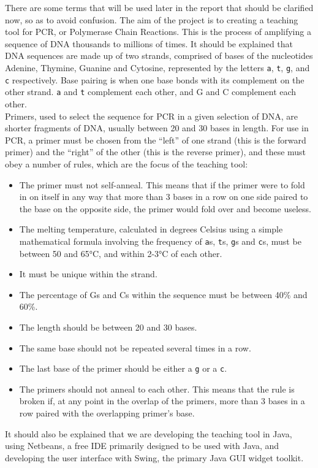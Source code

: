 There are some terms that will be used later in the report that should be clarified now, so as to avoid confusion. The aim of the project is to creating a teaching tool for PCR, or Polymerase Chain Reactions. This is the process of amplifying a sequence of DNA thousands to millions of times. It should be explained that DNA sequences are made up of two strands, comprised of bases of the nucleotides Adenine, Thymine, Guanine and Cytosine, represented by the letters \verb£a£, \verb£t£, \verb£g£, and \verb£c£ respectively. Base pairing is when one base bonds with its complement on the other strand. \verb£a£ and \verb£t£ complement each other, and G and C complement each other.\\
Primers, used to select the sequence for PCR in a given selection of DNA, are shorter fragments of DNA, usually between 20 and 30 bases in length. For use in PCR, a primer must be chosen from the “left” of one strand (this is the forward primer) and the “right” of the other (this is the reverse primer), and these must obey a number of rules, which are the focus of the teaching tool:
\begin{itemize}
\item The primer must not self-anneal. This means that if the primer were to fold in on itself in any way that more than 3 bases in a row on one side paired to the base on the opposite side, the primer would fold over and become useless.
\item The melting temperature, calculated in degrees Celsius using a simple mathematical formula involving the frequency of \verb£a£s, \verb£t£s, \verb£g£s and \verb£c£s, must be between 50 and 65°C, and within 2-3°C of each other.
\item It must be unique within the strand.
\item The percentage of Gs and Cs within the sequence must be between 40\% and 60\%.
\item The length should be between 20 and 30 bases.
\item The same base should not be repeated several times in a row.
\item The last base of the primer should be either a \verb£g£ or a \verb£c£.
\item The primers should not anneal to each other. This means that the rule is broken if, at any point in the overlap of the primers, more than 3 bases in a row paired with the overlapping primer’s base.
\end{itemize}
It should also be explained that we are developing the teaching tool in Java, using Netbeans, a free IDE primarily designed to be used with Java, and developing the user interface with Swing, the primary Java GUI widget toolkit.
